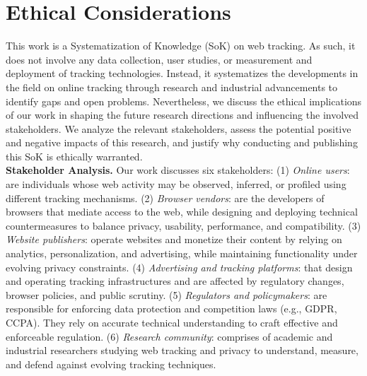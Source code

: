\documentclass[letterpaper,twocolumn,10pt]{article}
\begin{document}
% 


\appendix
\section*{Ethical Considerations}

This work is a Systematization of Knowledge (SoK) on web tracking. 
%
As such, it does not involve any data collection, user studies, or measurement  and deployment of tracking technologies.
%
Instead, it systematizes the developments in the field on online tracking through research and industrial advancements to identify gaps and open problems.
%
Nevertheless, we discuss the ethical implications of our work in shaping the future research directions and influencing the involved stakeholders.
%
We analyze the relevant stakeholders, assess the potential positive and negative impacts of this research, and justify why conducting and publishing this SoK is ethically warranted.\\

\noindent \textbf{Stakeholder Analysis.} 
%
Our work discusses six stakeholders: 
%
(1) \textit{Online users}: 
%
are individuals whose web activity may be observed, inferred, or profiled using different tracking mechanisms. 
%
(2) \textit{Browser vendors}: 
%
are the developers of browsers that mediate access to the web, while designing and deploying technical countermeasures to balance privacy, usability, performance, and compatibility.
%
(3) \textit{Website publishers}: 
%
operate websites and monetize their content by relying on analytics, personalization, and advertising, while maintaining functionality under evolving privacy constraints.
%
(4) \textit{Advertising and tracking platforms}: 
%
that design and operating tracking infrastructures and are affected by regulatory changes, browser policies, and public scrutiny.
%
(5) \textit{Regulators and policymakers}: 
%
are responsible for enforcing data protection and competition laws (e.g., GDPR, CCPA). They rely on accurate technical understanding to craft effective and enforceable regulation.
%
(6) \textit{Research community}: 
%
comprises of academic and industrial researchers studying web tracking and privacy to understand, measure, and defend against evolving tracking techniques.\\
\end{document}
